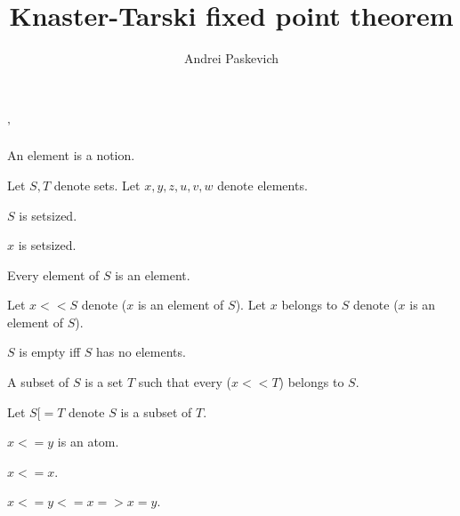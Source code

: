 \documentclass{article}
\title{Knaster-Tarski fixed point theorem}
\author{Andrei Paskevich}
\date{}
\begin{document}
'

  \maketitle

  \begin{forthel}

    \begin{signature}
      An element is a notion.
    \end{signature}

    Let $S,T$ denote sets.
    Let $x,y,z,u,v,w$ denote elements.

    \begin{axiom}
      $S$ is setsized.
    \end{axiom}

    \begin{axiom}
      $x$ is setsized.
    \end{axiom}

    \begin{axiom}
      Every element of $S$ is an element.
    \end{axiom}

    Let $x << S$ denote ($x$ is an element of $S$).
    Let $x$ belongs to $S$ denote ($x$ is an element of $S$).

    \begin{definition}[DefEmpty]
      $S$ is empty iff $S$ has no elements.
    \end{definition}

    \begin{definition}[DefSub]
      A subset of $S$ is a set $T$ such that every ($x << T$) belongs to $S$.
    \end{definition}

    Let $S [= T$ denote $S$ is a subset of $T$.

    \begin{signature}[LessRel]
      $x <= y$ is an atom.
    \end{signature}

    \begin{axiom}[ARefl]
      $x <= x$.
    \end{axiom}

    \begin{axiom}[ASymm]
      $x <= y <= x => x = y$.
    \end{axiom}


\end{forthel}
\end{document}
